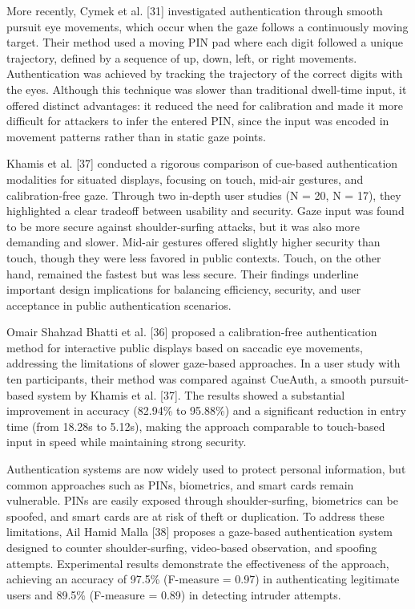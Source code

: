 \documentclass{article}
\begin{document}
More recently, Cymek et al. [31] investigated authentication through smooth pursuit eye movements, which occur when the gaze follows a continuously moving target.
Their method used a moving PIN pad where each digit followed a unique trajectory, defined by a sequence of up, down, left, or right movements.
Authentication was achieved by tracking the trajectory of the correct digits with the eyes. 
Although this technique was slower than traditional dwell-time input, it offered distinct advantages: it reduced the need for calibration and made it more difficult for attackers to infer the entered PIN, since the input was encoded in movement patterns rather than in static gaze points.

Khamis et al. [37] conducted a rigorous comparison of cue-based authentication modalities for situated displays, focusing on touch, mid-air gestures, and calibration-free gaze. 
Through two in-depth user studies (N = 20, N = 17), they highlighted a clear tradeoff between usability and security. 
Gaze input was found to be more secure against shoulder-surfing attacks, but it was also more demanding and slower.
Mid-air gestures offered slightly higher security than touch, though they were less favored in public contexts.
Touch, on the other hand, remained the fastest but was less secure.
Their findings underline important design implications for balancing efficiency, security, and user acceptance in public authentication scenarios.

Omair Shahzad Bhatti et al. [36] proposed a calibration-free authentication method for interactive public displays based on saccadic eye movements, addressing the limitations of slower gaze-based approaches. 
In a user study with ten participants, their method was compared against CueAuth, a smooth pursuit-based system by Khamis et al. [37].
The results showed a substantial improvement in accuracy (82.94\% to 95.88\%) and a significant reduction in entry time (from 18.28s to 5.12s), making the approach comparable to touch-based input in speed while maintaining strong security.

Authentication systems are now widely used to protect personal information, but common approaches such as PINs, biometrics, and smart cards remain vulnerable. 
PINs are easily exposed through shoulder-surfing, biometrics can be spoofed, and smart cards are at risk of theft or duplication. 
To address these limitations, Ail Hamid Malla [38] proposes a gaze-based authentication system designed to counter shoulder-surfing, video-based observation, and spoofing attempts.
Experimental results demonstrate the effectiveness of the approach, achieving an accuracy of 97.5\% (F-measure = 0.97) in authenticating legitimate users and 89.5\% (F-measure = 0.89) in detecting intruder attempts.
\end{document}
